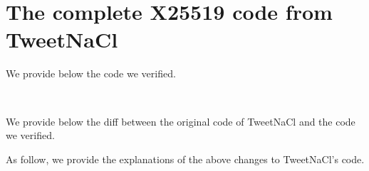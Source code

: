 \section{The complete X25519 code from TweetNaCl}
\label{verified-C-and-diff}

 We provide below the code we verified.


~

 We provide below the diff between the original code of TweetNaCl and the code we verified.



As follow, we provide the explanations of the above changes to TweetNaCl's code.

